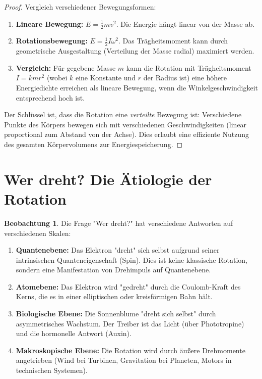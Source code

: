 \documentclass[12pt,a4paper]{report}
\theoremstyle{plain}
\theoremstyle{definition}
\newtheorem{beobachtung}[theorem]{Beobachtung}
\theoremstyle{remark}
\begin{document}
\begin{proof}
	Vergleich verschiedener Bewegungsformen:
	
	\begin{enumerate}
		\item \textbf{Lineare Bewegung:} $E = \frac{1}{2} m v^2$. Die Energie hängt linear von der Masse ab.
		
		\item \textbf{Rotationsbewegung:} $E = \frac{1}{2} I \omega^2$. Das Trägheitsmoment kann durch geometrische Ausgestaltung (Verteilung der Masse radial) maximiert werden.
		
		\item \textbf{Vergleich:} Für gegebene Masse $m$ kann die Rotation mit Trägheitsmoment $I = k m r^2$ (wobei $k$ eine Konstante und $r$ der Radius ist) eine höhere Energiedichte erreichen als lineare Bewegung, wenn die Winkelgeschwindigkeit entsprechend hoch ist.
	\end{enumerate}
	
	Der Schlüssel ist, dass die Rotation eine \emph{verteilte} Bewegung ist: Verschiedene Punkte des Körpers bewegen sich mit verschiedenen Geschwindigkeiten (linear proportional zum Abstand von der Achse). Dies erlaubt eine effiziente Nutzung des gesamten Körpervolumens zur Energiespeicherung.
\end{proof}

\section{Wer dreht? Die Ätiologie der Rotation}

\begin{beobachtung}
	Die Frage "Wer dreht?" hat verschiedene Antworten auf verschiedenen Skalen:
	
	\begin{enumerate}
		\item \textbf{Quantenebene:} Das Elektron "dreht" sich selbst aufgrund seiner intrinsischen Quanteneigenschaft (Spin). Dies ist keine klassische Rotation, sondern eine Manifestation von Drehimpuls auf Quantenebene.
		
		\item \textbf{Atomebene:} Das Elektron wird "gedreht" durch die Coulomb-Kraft des Kerns, die es in einer elliptischen oder kreisförmigen Bahn hält.
		
		\item \textbf{Biologische Ebene:} Die Sonnenblume "dreht sich selbst" durch asymmetrisches Wachstum. Der Treiber ist das Licht (über Phototropine) und die hormonelle Antwort (Auxin).
		
		\item \textbf{Makroskopische Ebene:} Die Rotation wird durch äußere Drehmomente angetrieben (Wind bei Turbinen, Gravitation bei Planeten, Motors in technischen Systemen).
	\end{enumerate}
\end{beobachtung}
\end{document}
